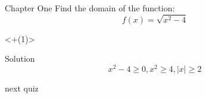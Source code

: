 \documentclass[9pt]{beamer}
\begin{document}
\begin{frame}{Chapter One}
Find the domain of the function:
\[  f(x)=\sqrt{x^{2}-4}\]

\begin{onlyenv}<+(1)>
  \begin{block}{Solution}
  \[x^{2}-4 \geq 0, x^{2}\geq 4, |x|\geq 2\]
  \end{block}
\end{onlyenv}

\pause 
next quiz
\end{frame}
\end{document}
